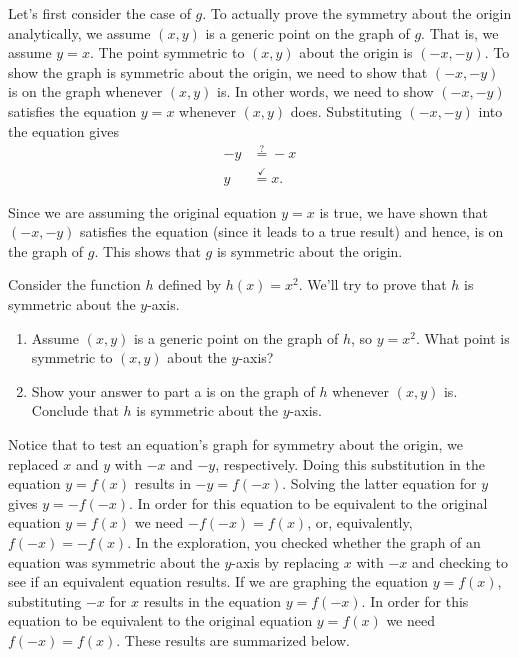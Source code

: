 \documentclass[nooutcomes]{ximera}
\begin{document}
Let's first consider the case of $g$. To actually prove the symmetry about the origin analytically, we assume $(x,y)$ is a generic point on the graph of $g$. That is, we assume  $y = x$.  The point symmetric to $(x,y)$ about the origin is $(-x,-y)$.  To show the graph is symmetric about the origin, we need to show that $(-x,-y)$ is on the graph whenever $(x,y)$ is.  In other words, we need to show $(-x,-y)$ satisfies the equation $y = x$ whenever $(x,y)$ does.  Substituting $(-x, -y)$ into the equation gives
\begin{align*}
-y &\stackrel{?}{=} -x \\
y &\stackrel{\checkmark}{=} x.
\end{align*}

Since we are assuming the original equation $y = x$ is true, we have shown that $(-x, -y)$ satisfies the equation (since it leads to a true result) and hence, is on the graph of $g$. This shows that $g$ is symmetric about the origin.



\begin{exploration}
Consider the function $h$ defined by $h(x) = x^2$. We'll try to prove that $h$ is symmetric about the $y$-axis. 
\begin{enumerate}[label=\alph*.]
\item Assume $(x, y)$ is a generic point on the graph of $h$, so $y = x^2$. What point is symmetric to $(x, y)$ about the $y$-axis?
\item Show your answer to part a is on the graph of $h$ whenever $(x, y)$ is. Conclude that $h$ is symmetric about the $y$-axis. 
\end{enumerate}
\end{exploration}

Notice that to test an equation's graph for symmetry about the origin, we replaced $x$ and $y$ with $-x$ and $-y$, respectively.  Doing this substitution in the equation $y = f(x)$ results in $-y = f(-x)$.  Solving the latter equation for $y$ gives $y = -f(-x)$.  In order for this equation to be equivalent to the original equation $y=f(x)$ we need $-f(-x) = f(x)$, or, equivalently, $f(-x) = -f(x)$. In the exploration, you checked whether the graph of an equation was symmetric about the $y$-axis by replacing $x$ with $-x$ and checking to see if an equivalent equation results.  If we are graphing the equation $y=f(x)$, substituting $-x$ for $x$ results in the equation $y=f(-x)$.  In order for this equation to be equivalent to the original equation $y=f(x)$ we need $f(-x) = f(x)$. These results are summarized below.
\end{document}
